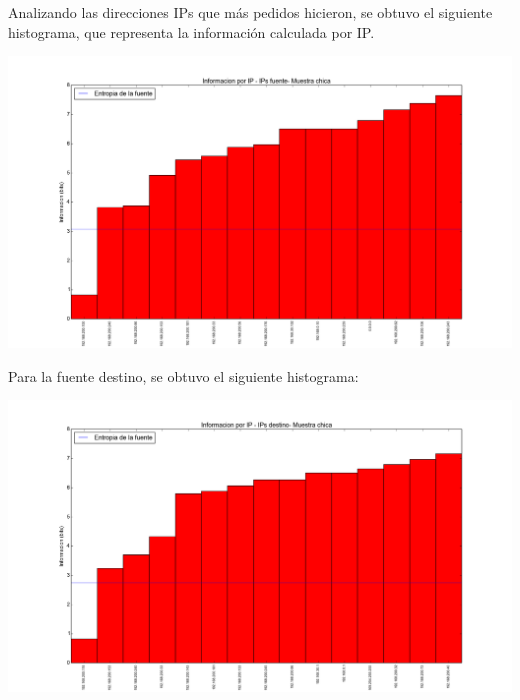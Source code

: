 \indent \indent Analizando las direcciones IPs que más pedidos hicieron, se obtuvo el siguiente histograma, que representa la información calculada por IP.

\includegraphics[scale=0.5,clip=true,trim=100 0 0 0]{graphics/laburo_chica_src.png}



\indent Para la fuente destino, se obtuvo el siguiente histograma:

\includegraphics[scale=0.5,clip=true,trim=100 0 0 0]{graphics/laburo_chica_dst.png}



